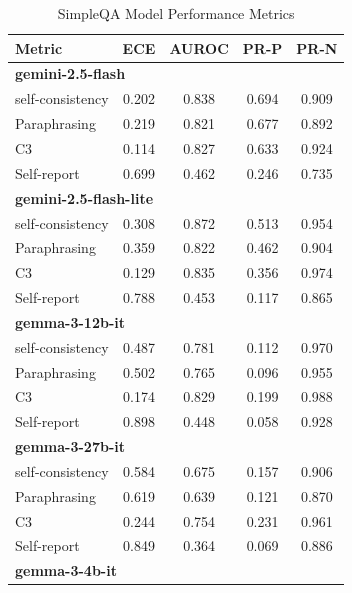 \documentclass[11pt]{article}
\theoremstyle{plain}
\theoremstyle{definition}
\theoremstyle{remark}
\begin{document}
\begin{table}[p]
\centering
\caption{SimpleQA Model Performance Metrics}
\label{tab:simpleqa-metrics}
\scriptsize
\begin{minipage}[t]{0.48\textwidth}
    \centering
    \begin{tabular}{lcccc}
        \toprule
        \textbf{Metric} & \textbf{ECE} & \textbf{AUROC} & \textbf{PR-P} & \textbf{PR-N} \\
        \midrule
        \multicolumn{5}{l}{\textbf{gemini-2.5-flash}} \\
        self-consistency & 0.202 & 0.838 & 0.694 & 0.909 \\
        Paraphrasing     & 0.219 & 0.821 & 0.677 & 0.892 \\
       C3             & 0.114 & 0.827 & 0.633 & 0.924 \\
        Self-report      & 0.699 & 0.462 & 0.246 & 0.735 \\
        \midrule
        \multicolumn{5}{l}{\textbf{gemini-2.5-flash-lite}} \\
        self-consistency & 0.308 & 0.872 & 0.513 & 0.954 \\
        Paraphrasing     & 0.359 & 0.822 & 0.462 & 0.904 \\
       C3             & 0.129 & 0.835 & 0.356 & 0.974 \\
        Self-report      & 0.788 & 0.453 & 0.117 & 0.865 \\
        \midrule
        \multicolumn{5}{l}{\textbf{gemma-3-12b-it}} \\
        self-consistency & 0.487 & 0.781 & 0.112 & 0.970 \\
        Paraphrasing     & 0.502 & 0.765 & 0.096 & 0.955 \\
       C3             & 0.174 & 0.829 & 0.199 & 0.988 \\
        Self-report      & 0.898 & 0.448 & 0.058 & 0.928 \\
        \midrule
        \multicolumn{5}{l}{\textbf{gemma-3-27b-it}} \\
        self-consistency & 0.584 & 0.675 & 0.157 & 0.906 \\
        Paraphrasing     & 0.619 & 0.639 & 0.121 & 0.870 \\
       C3             & 0.244 & 0.754 & 0.231 & 0.961 \\
        Self-report      & 0.849 & 0.364 & 0.069 & 0.886 \\
        \midrule
        \multicolumn{5}{l}{\textbf{gemma-3-4b-it}} \\

\end{tabular}
\end{minipage}
\end{table}
\end{document}

